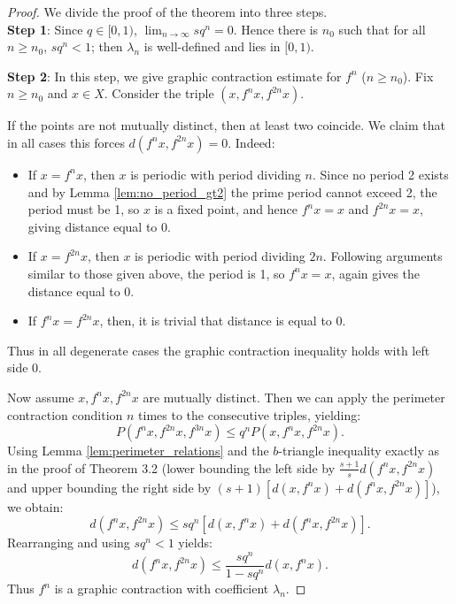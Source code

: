 \documentclass[a4paper,12pt,oneside]{article}
\numberwithin{equation}{section}
\begin{document}
\begin{proof}
	We divide the proof of the theorem into three steps.\\
\textbf{Step 1}:  Since $q\in [0,1)$, $\lim_{n\to \infty}s q^{n} = 0$. Hence there is $n_0$ such that for all $n\geq n_0$, $sq^n< 1$; then $\lambda_{n}$ is well-defined and lies in $[0,1)$.

\textbf{Step 2}: In this step, we give graphic contraction estimate for $f^n$ ($n\geq n_0$). Fix $n\geq n_0$ and $x\in X$. Consider the triple $(x, f^n x, f^{2n} x)$.

If the points are not mutually distinct, then at least two coincide. We claim that in all cases this forces $d(f^n x, f^{2n} x)=0$. Indeed:
\begin{itemize}
\item If $x = f^n x$, then $x$ is periodic with period dividing $n$. Since no period 2 exists and by Lemma \ref{lem:no_period_gt2} the prime period cannot exceed 2, the period must be 1, so $x$ is a fixed point, and hence $f^n x = x$ and $f^{2n}x = x$, giving distance equal to 0.
\item If $x = f^{2n} x$, then $x$ is periodic with period dividing $2n$. Following arguments similar to those given above, the period is 1, so $f^n x = x$, again gives the  distance equal to 0.
\item If $f^n x = f^{2n} x$, then, it is trivial that distance is equal to 0.
\end{itemize}
Thus in all degenerate cases the graphic contraction inequality holds with left side 0.

Now assume $x, f^n x, f^{2n} x$ are mutually distinct. Then we can apply the perimeter contraction condition $n$ times to the consecutive triples, yielding:
\begin{equation}
P(f^n x, f^{2n} x, f^{3n} x) \leq q^n P(x, f^n x, f^{2n} x).
\label{eq:main_triple}
\end{equation}
Using Lemma \ref{lem:perimeter_relations} and the $b$-triangle inequality exactly as in the proof of Theorem 3.2 (lower bounding the left side by $\frac{s+1}{s} d(f^n x, f^{2n} x)$ and upper bounding the right side by $(s+1)[d(x,f^n x)+d(f^n x, f^{2n} x)]$), we obtain:
\[
d(f^n x, f^{2n} x) \leq sq^n [d(x,f^n x) + d(f^n x, f^{2n} x)].
\]
Rearranging and using $sq^n < 1$ yields:
\begin{equation}
d(f^n x, f^{2n} x) \leq \frac{sq^n}{1 - sq^n} d(x, f^n x).
\label{eq:main_graphic}
\end{equation}
Thus $f^n$ is a graphic contraction with coefficient $\lambda_n$.


\end{proof}
\end{document}
